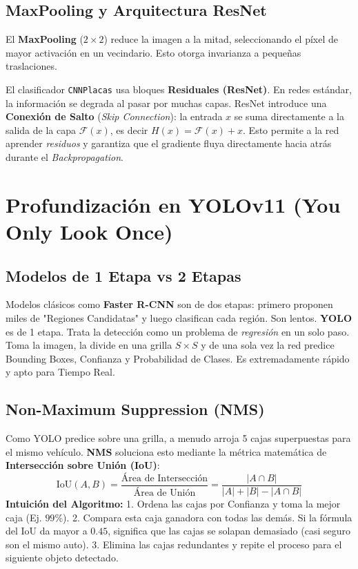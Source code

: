 \documentclass[11pt,a4paper]{article}
\begin{document}
\subsection{MaxPooling y Arquitectura ResNet}
El \textbf{MaxPooling} ($2\times2$) reduce la imagen a la mitad, seleccionando el p\'ixel de mayor activaci\'on en un vecindario. Esto otorga invarianza a pequeñas traslaciones.

El clasificador \texttt{CNNPlacas} usa bloques \textbf{Residuales (ResNet)}. En redes est\'andar, la informaci\'on se degrada al pasar por muchas capas. ResNet introduce una \textbf{Conexi\'on de Salto} (\emph{Skip Connection}): la entrada $x$ se suma directamente a la salida de la capa $\mathcal{F}(x)$, es decir $H(x) = \mathcal{F}(x) + x$. Esto permite a la red aprender \emph{residuos} y garantiza que el gradiente fluya directamente hacia atr\'as durante el \emph{Backpropagation}.

\section{Profundizaci\'on en YOLOv11 (You Only Look Once)}

\subsection{Modelos de 1 Etapa vs 2 Etapas}
Modelos cl\'asicos como \textbf{Faster R-CNN} son de dos etapas: primero proponen miles de "Regiones Candidatas" y luego clasifican cada regi\'on. Son lentos.
\textbf{YOLO} es de 1 etapa. Trata la detecci\'on como un problema de \emph{regresi\'on} en un solo paso. Toma la imagen, la divide en una grilla $S \times S$ y de una sola vez la red predice Bounding Boxes, Confianza y Probabilidad de Clases. Es extremadamente r\'apido y apto para Tiempo Real.

\subsection{Non-Maximum Suppression (NMS)}
Como YOLO predice sobre una grilla, a menudo arroja 5 cajas superpuestas para el mismo veh\'iculo. \textbf{NMS} soluciona esto mediante la m\'etrica matem\'atica de \textbf{Intersecci\'on sobre Uni\'on (IoU)}:
\begin{equation}
\text{IoU}(A, B) = \frac{\text{\'Area de Intersecci\'on}}{\text{\'Area de Uni\'on}} = \frac{|A \cap B|}{|A| + |B| - |A \cap B|}
\end{equation}
\textbf{Intuici\'on del Algoritmo:}
1. Ordena las cajas por Confianza y toma la mejor caja (Ej. $99\%$).
2. Compara esta caja ganadora con todas las dem\'as. Si la f\'ormula del IoU da mayor a $0.45$, significa que las cajas se solapan demasiado (casi seguro son el mismo auto).
3. Elimina las cajas redundantes y repite el proceso para el siguiente objeto detectado.
\end{document}
